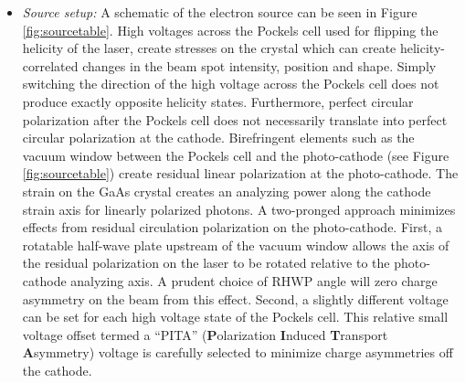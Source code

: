 \begin{itemize}
\item {\it Source setup:} A schematic of the electron source can be seen in Figure \ref{fig:sourcetable}. High voltages across the Pockels cell used for flipping the helicity of the laser, create stresses on the crystal which can create helicity-correlated changes in the beam spot intensity, position and shape. Simply switching the direction of the high voltage across the Pockels cell does not produce exactly opposite helicity states. Furthermore, perfect circular polarization after the Pockels cell does not necessarily translate into perfect circular polarization at the cathode. Birefringent elements such as the vacuum window between the Pockels cell and the photo-cathode (see Figure \ref{fig:sourcetable}) create residual linear polarization at the photo-cathode. The strain on the GaAs crystal creates an analyzing power along the cathode strain axis for linearly polarized photons. A two-pronged approach minimizes effects from residual circulation polarization on the photo-cathode. First, a rotatable half-wave plate upstream of the vacuum window allows the axis of the residual polarization on the laser to be rotated relative to the photo-cathode analyzing axis. A prudent choice of RHWP angle will zero charge asymmetry on the beam from this effect. Second, a slightly different voltage can be set for each high voltage state of the Pockels cell. This relative small voltage offset termed a ``PITA'' (\textbf{P}olarization \textbf{I}nduced \textbf{T}ransport \textbf{A}symmetry) voltage is carefully selected to minimize charge asymmetries off the cathode. 


\end{itemize}
